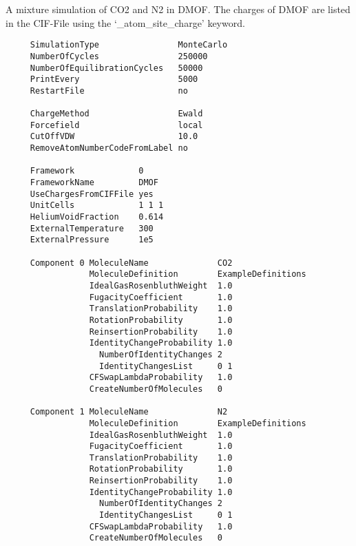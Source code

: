 A mixture simulation of CO2 and N2 in DMOF. The charges of DMOF are listed in the CIF-File using the `\_atom\_site\_charge' keyword.
\begin{tiny}
\begin{verbatim}
     SimulationType                MonteCarlo
     NumberOfCycles                250000
     NumberOfEquilibrationCycles   50000
     PrintEvery                    5000
     RestartFile                   no

     ChargeMethod                  Ewald
     Forcefield                    local
     CutOffVDW                     10.0
     RemoveAtomNumberCodeFromLabel no

     Framework             0
     FrameworkName         DMOF
     UseChargesFromCIFFile yes
     UnitCells             1 1 1
     HeliumVoidFraction    0.614
     ExternalTemperature   300
     ExternalPressure      1e5

     Component 0 MoleculeName              CO2
                 MoleculeDefinition        ExampleDefinitions
                 IdealGasRosenbluthWeight  1.0
                 FugacityCoefficient       1.0
                 TranslationProbability    1.0
                 RotationProbability       1.0
                 ReinsertionProbability    1.0
                 IdentityChangeProbability 1.0
                   NumberOfIdentityChanges 2
                   IdentityChangesList     0 1
                 CFSwapLambdaProbability   1.0
                 CreateNumberOfMolecules   0

     Component 1 MoleculeName              N2
                 MoleculeDefinition        ExampleDefinitions
                 IdealGasRosenbluthWeight  1.0
                 FugacityCoefficient       1.0
                 TranslationProbability    1.0
                 RotationProbability       1.0
                 ReinsertionProbability    1.0
                 IdentityChangeProbability 1.0
                   NumberOfIdentityChanges 2
                   IdentityChangesList     0 1
                 CFSwapLambdaProbability   1.0
                 CreateNumberOfMolecules   0
\end{verbatim}
\end{tiny}

